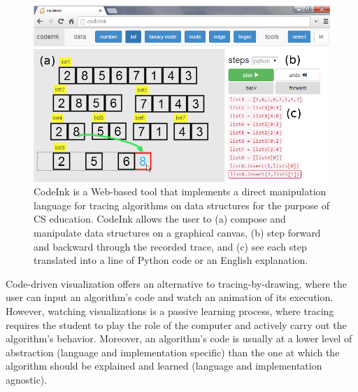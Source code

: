 \begin{figure}

\begin{center}
\includegraphics[width=\columnwidth]{img/frontpage-mergesort.png}
\end{center}

\caption{CodeInk is a Web-based tool that implements a direct
manipulation language for tracing algorithms on data structures for the
purpose of CS education. CodeInk allows the user to (a) compose and
manipulate data structures on a graphical canvas, (b) step forward and
backward through the recorded trace, and (c) see each step translated
into a line of Python code or an English explanation.}


\label{fig:codeink-intro}
\end{figure}

Code-driven visualization offers an alternative to tracing-by-drawing, where the
user can input an algorithm's code and watch an animation of its execution.
However, watching visualizations is a passive learning process, where tracing
requires the student to play the role of the computer and actively carry out the
algorithm's behavior. Moreover, an algorithm's code is usually at a lower level
of abstraction (language and implementation specific) than the one at which the
algorithm should be explained and learned (language and implementation
agnostic).

